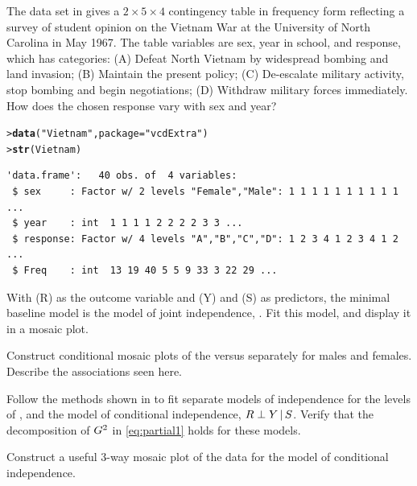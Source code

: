 \documentclass[11pt]{report}\usepackage[]{graphicx}\usepackage[]{color}
\makeatletter
\newcommand{\hlstr}[1]{\textcolor[rgb]{0.192,0.494,0.8}{#1}}%
\newcommand{\hlstd}[1]{\textcolor[rgb]{0.345,0.345,0.345}{#1}}%
\newcommand{\hlkwc}[1]{\textcolor[rgb]{0.333,0.667,0.333}{#1}}%
\newcommand{\hlkwd}[1]{\textcolor[rgb]{0.737,0.353,0.396}{\textbf{#1}}}%
\newenvironment{kframe}{%
 \def\at@end@of@kframe{}%
 \ifinner\ifhmode%
  \def\at@end@of@kframe{\end{minipage}}%
  \begin{minipage}{\columnwidth}%
 \fi\fi%
 \def\FrameCommand##1{\hskip\@totalleftmargin \hskip-\fboxsep
 \colorbox{shadecolor}{##1}\hskip-\fboxsep
     \hskip-\linewidth \hskip-\@totalleftmargin \hskip\columnwidth}%
 \MakeFramed {\advance\hsize-\width
   \@totalleftmargin\z@ \linewidth\hsize
   \@setminipage}}%
 {\par\unskip\endMakeFramed%
 \at@end@of@kframe}
\newenvironment{knitrout}{}{} %
\renewenvironment{knitrout}{\small\renewcommand{\baselinestretch}{.85}}{} %
\makeatother
\begin{document}
\begin{Exercises}
  \exercise\label{lab:mosaic-vietnam}The data set  in  gives a $2 \times 5 \times 4$ contingency table in frequency form reflecting a survey of student opinion on the Vietnam War at the University of North Carolina in May 1967.  
  The table variables are sex, year in school, and response, which has categories: (A) Defeat North Vietnam by widespread bombing and land invasion; (B) Maintain the present policy; (C) De-escalate military activity, stop bombing and begin negotiations; (D) Withdraw military forces immediately.  How does the chosen response vary with sex and year?
\begin{knitrout}
\color{fgcolor}\begin{kframe}
\begin{alltt}
\hlstd{> }\hlkwd{data}\hlstd{(}\hlstr{"Vietnam"}\hlstd{,} \hlkwc{package} \hlstd{=} \hlstr{"vcdExtra"}\hlstd{)}
\hlstd{> }\hlkwd{str}\hlstd{(Vietnam)}
\end{alltt}
\begin{verbatim}
'data.frame':	40 obs. of  4 variables:
 $ sex     : Factor w/ 2 levels "Female","Male": 1 1 1 1 1 1 1 1 1 1 ...
 $ year    : int  1 1 1 1 2 2 2 2 3 3 ...
 $ response: Factor w/ 4 levels "A","B","C","D": 1 2 3 4 1 2 3 4 1 2 ...
 $ Freq    : int  13 19 40 5 5 9 33 3 22 29 ...
\end{verbatim}
\end{kframe}
\end{knitrout}
    \begin{enumerate*}
      \item With  (R) as the outcome variable and  (Y) and  (S) as predictors, the minimal
      baseline \loglin model is the model of joint independence, .  Fit this model, and display it in
      a mosaic plot.
      \item Construct conditional mosaic plots of the  versus  separately for males and females.
      Describe the associations seen here.
      \item Follow the methods shown in  to fit separate models of independence for the levels of ,
      and the model of conditional independence, $R \perp Y \, | \, S$.
      Verify that the decomposition of $G^2$ in \eqref{eq:partial1} holds for these models.
      \item Construct a useful 3-way mosaic plot of the data for the model of conditional independence.
    \end{enumerate*}


\end{Exercises}
\end{document}
